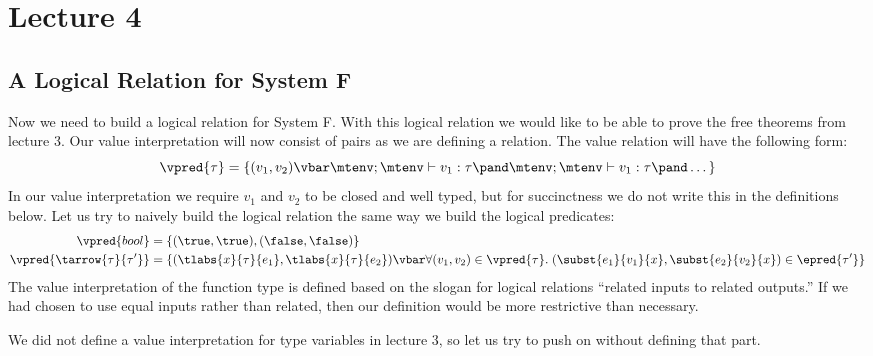 \section*{Lecture 4}
\subsection*{A Logical Relation for System F}
Now we need to build a logical relation for System F. With this logical relation we would like to be able to prove the free theorems from lecture 3. Our value interpretation will now consist of pairs as we are defining a relation. The value relation will have the following form:
\[
  \vpred{\tau} = \{(v_1,v_2) \vbar
                        \mtenv ; \mtenv \vdash v_1 : \tau \pand
                        \mtenv ; \mtenv \vdash v_1 : \tau \pand \dots \}
\]
In our value interpretation we require $v_1$ and $v_2$ to be closed and well typed, but for succinctness we do not write this in the definitions below.
Let us try to naively build the logical relation the same way we build the logical predicates:
\begin{align*}
  \vpred{bool}                 & = \{ (\true,\true), (\false,\false) \} \\
  \vpred{\tarrow{\tau}{\tau'}} & = \{ (\tlabs{x}{\tau}{e_1},\tlabs{x}{\tau}{e_2}) \vbar \forall (v_1,v_2) \in \vpred{\tau}. \; (\subst{e_1}{v_1}{x},\subst{e_2}{v_2}{x}) \in \epred{\tau'} \}
\end{align*}
The value interpretation of the function type is defined based on the slogan for logical relations ``related inputs to related outputs.'' If we had chosen to use equal inputs rather than related, then our definition would be more restrictive than necessary.

We did not define a value interpretation for type variables in lecture 3, so let us try to push on without defining that part.

